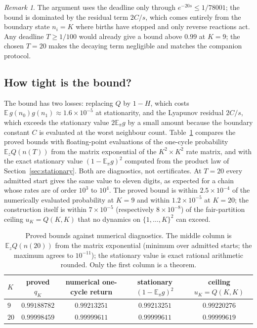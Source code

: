 \documentclass[11pt,a4paper]{article}
\theoremstyle{plain}
\theoremstyle{definition}
\theoremstyle{remark}
\newtheorem{remark}[theorem]{Remark}
\newcommand{\EE}{\mathbb E}
\begin{document}
\begin{remark}
The argument uses the deadline only through $e^{-20s}\le1/78001$; the bound is dominated by the residual term $2C/s$, which comes entirely from the boundary state $n_i=K$ where births have stopped and only reverse reactions act. Any deadline $T\ge1/100$ would already give a bound above $0.99$ at $K=9$; the chosen $T=20$ makes the decaying term negligible and matches the companion protocol.
\end{remark}

\subsection{How tight is the bound?}\label{sec:tight}
The bound has two losses: replacing $Q$ by $1-H$, which costs $\EE\,g(n_0)g(n_1)\approx1.6\times10^{-5}$ at stationarity, and the Lyapunov residual $2C/s$, which exceeds the stationary value $2\EE_\pi g$ by a small amount because the boundary constant $C$ is evaluated at the worst neighbour count. Table~\ref{tab:tight} compares the proved bounds with floating-point evaluations of the one-cycle probability $\EE_zQ(n(T))$ from the matrix exponential of the $K^2\times K^2$ rate matrix, and with the exact stationary value $(1-\EE_\pi g)^2$ computed from the product law of Section~\ref{sec:stationary}. Both are diagnostics, not certificates. At $T=20$ every admitted start gives the same value to eleven digits, as expected for a chain whose rates are of order $10^3$ to $10^4$. The proved bound is within $2.5\times10^{-4}$ of the numerically evaluated probability at $K=9$ and within $1.2\times10^{-5}$ at $K=20$; the construction itself is within $7\times10^{-5}$ (respectively $8\times10^{-8}$) of the fair-partition ceiling $u_K=Q(K,K)$ that no dynamics on $\{1,\dots,K\}^2$ can exceed.

\begin{table}[t]
\centering\small
\caption{Proved bounds against numerical diagnostics. The middle column is $\EE_zQ(n(20))$ from the matrix exponential (minimum over admitted starts; the maximum agrees to $10^{-11}$); the stationary value is exact rational arithmetic rounded. Only the first column is a theorem.}\label{tab:tight}
\begin{tabular}{@{}lcccc@{}}
\toprule
$K$ & proved $q_K$ & numerical one-cycle return & stationary $(1-\EE_\pi g)^2$ & ceiling $u_K=Q(K,K)$\\
\midrule
$9$ & $0.99188782$ & $0.99213251$ & $0.99213251$ & $0.99220276$\\
$20$ & $0.99998459$ & $0.99999611$ & $0.99999611$ & $0.99999619$\\
\bottomrule
\end{tabular}
\end{table}
\end{document}
